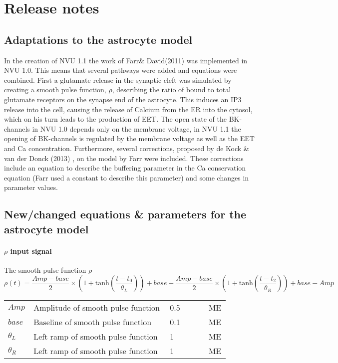 \section{Release notes}

\subsection{Adaptations to the astrocyte model}
In the creation of NVU 1.1 the work of Farr\& David(2011) \cite{Farr2011} was implemented in NVU 1.0. This means that several pathways were added and equations were combined. First a glutamate release in the synaptic cleft was simulated by creating a smooth pulse function, $\rho$, describing the ratio of bound to total glutamate receptors on the synapse end of the astrocyte. This induces an \gls{IP3} release into the cell, causing the release of Calcium from the \gls{ER} into the cytosol, which on his turn leads to the production of EET. The open state of the BK-channels in NVU 1.0 depends only on the membrane voltage, in NVU 1.1 the opening of BK-channels is regulated by the membrane voltage as well as the EET and \gls{Ca} concentration. Furthermore, several corrections, proposed by de Kock \& van der Donck (2013) \cite{LoesEvert}, on the model by Farr were included. These corrections include an equation to describe the buffering parameter in the \gls{Ca} conservation equation (Farr \cite{Farr2011} used a constant to describe this parameter) and some changes in parameter values.


\subsection{New/changed equations \& parameters for the astrocyte model}
\paragraph{$\rho$ input signal}

The smooth pulse function $\rho$
\begin{equation}
\rho(t) = \frac{Amp - base}{2}\times\left(1+\mathrm{tanh}\left(\frac{t-t_0}{\theta_L}\right)\right)+base+\frac{Amp-base}{2}\times\left(1+\mathrm{tanh}\left(\frac{t-t_2}{\theta_R}\right)\right)+base-Amp     
\end{equation}
%
\begin{table}[h!]
	\centering
	\begin{tabular}{| p{0.09\linewidth} | >{\footnotesize} p{0.6\linewidth} | >{\footnotesize} p{0.17\linewidth} | >{\footnotesize} p{0.02\linewidth} |}
		\arrayrulecolor{lightgrey}\hline
		$Amp$           & Amplitude of smooth pulse function & 0.5 & ME\\
		$base$          & Baseline of smooth pulse function & 0.1 & ME\\
		$\theta_L$      & Left ramp of smooth pulse function & 1 & ME\\
		$\theta_R$      & Left ramp of smooth pulse function & 1 & ME\\
		\hline
	\end{tabular}
\end{table}

